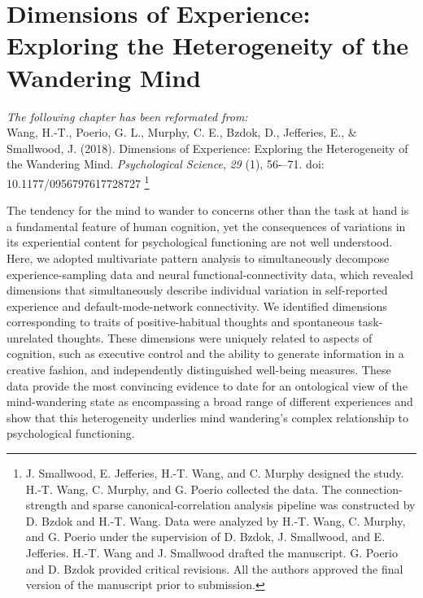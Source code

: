 \chapter{Dimensions of Experience: Exploring the Heterogeneity of the Wandering Mind}
\label{ch:study1}

\textit{The following chapter has been reformated from:\\}
Wang, H.-T., Poerio, G. L., Murphy, C. E., Bzdok, D., Jefferies, E., \& Smallwood, J. (2018). Dimensions of Experience: Exploring the Heterogeneity of the Wandering Mind. \textit{Psychological Science}, \textit{29} (1), 56-–71. doi: 10.1177/0956797617728727
\footnote{
J. Smallwood, E. Jefferies, H.-T. Wang, and C. Murphy designed the study. H.-T. Wang, C. Murphy, and G. Poerio collected the data. The connection-strength and sparse canonical-correlation analysis pipeline was constructed by D. Bzdok and H.-T. Wang. Data were analyzed by H.-T. Wang, C. Murphy, and G. Poerio under the supervision of D. Bzdok, J. Smallwood, and E. Jefferies. H.-T. Wang and J. Smallwood drafted the manuscript. G. Poerio and D. Bzdok provided critical revisions. All the authors approved the final version of the manuscript prior to submission.
}\\

\newpage

\noindent{}The tendency for the mind to wander to concerns other than the task at hand is a fundamental feature of human cognition, yet the consequences of variations in its experiential content for psychological functioning are not well understood. Here, we adopted multivariate pattern analysis to simultaneously decompose experience-sampling data and neural functional-connectivity data, which revealed dimensions that simultaneously describe individual variation in self-reported experience and default-mode-network connectivity. We identified dimensions corresponding to traits of positive-habitual thoughts and spontaneous task-unrelated thoughts. These dimensions were uniquely related to aspects of cognition, such as executive control and the ability to generate information in a creative fashion, and independently distinguished well-being measures. These data provide the most convincing evidence to date for an ontological view of the mind-wandering state as encompassing a broad range of different experiences and show that this heterogeneity underlies mind wandering's complex relationship to psychological functioning.

